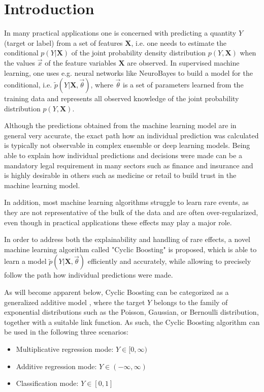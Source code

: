 \documentclass[BCOR=1mm, DIV=calc,10pt,
twoside=true,
twocolumn,
headings=normal]{scrartcl}
\begin{document}


\section{Introduction}

In many practical applications one is concerned with predicting a quantity $Y$ (target or
label) from a set of features $\bm{X}$, i.e. one needs to estimate the conditional
$p(Y|\bm{X})$ of the joint probability density distribution $p(Y,\bm{X})$ when the values
$\vec{x}$ of the feature variables $\bm{X}$ are observed. In supervised machine learning,
one uses e.g. neural networks like NeuroBayes \cite{NeuroBayes} to build a model for the
conditional, i.e. $\tilde{p}(Y|\bm{X},\vec{\theta})$, where $\vec{\theta}$ is a set of
parameters learned from  the training data and represents all observed knowledge of the
joint probability distribution $p(Y,\bm{X})$.

Although the predictions obtained from the machine learning model are in general very
accurate, the exact path how an individual prediction was calculated is typically not
observable in complex ensemble or deep learning models. Being able to explain how
individual predictions and decisions were made can be a mandatory legal requirement in
many sectors such as finance and insurance and is highly desirable in others such as
medicine or retail to build trust in the machine learning model.

In addition, most machine learning algorithms struggle to learn rare events, as they are
not representative of the bulk of the data and are often over-regularized, even though in
practical applications these effects may play a major role.

In order to address both the explainability and handling of rare effects, a novel machine
learning algorithm called "Cyclic Boosting" is proposed, which is able to learn a model
$\tilde{p}(Y|\bm{X},\vec{\theta})$ efficiently and accurately, while allowing to precisely
follow the path how individual predictions were made.

As will become apparent below, Cyclic Boosting can be categorized as a generalized
additive model \cite{GAM}, where the target $Y$ belongs to the family of exponential
distributions such as the Poisson, Gaussian, or Bernoulli distribution, together with a
suitable link function. As such, the Cyclic Boosting algorithm can be used in the
following three scenarios:
\begin{itemize}
\item{Multiplicative regression mode: $Y \in [0, \infty)$}
\item{Additive regression mode: $Y \in (-\infty, \infty)$}
\item{Classification mode: $Y \in [0, 1]$}
\end{itemize}
\end{document}
